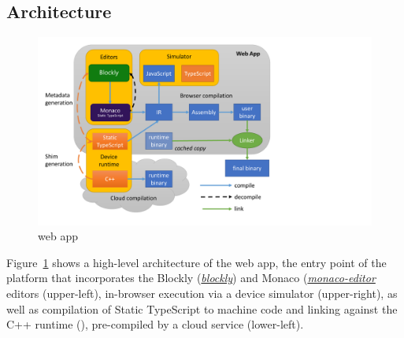 

    


\subsection{Architecture}

\begin{figure}[t]
    \includegraphics[width=4.8in]{makecodeFig.pdf}
\caption{\label{fig:makecode}\MC web app}
\end{figure}

Figure~\ref{fig:makecode} shows a high-level architecture of
the \MC web app, the entry point of the platform that
incorporates the Blockly
(\emph{\href{https://github.com/google/blockly}{blockly}}) and Monaco
(\emph{\href{https://github.com/Microsoft/monaco-editor}{monaco-editor}}
editors (upper-left), in-browser execution via a device simulator (upper-right),
as well as compilation of Static TypeScript to machine code and linking against 
the C++ runtime (\emph{\CON}), pre-compiled by a cloud service (lower-left).

